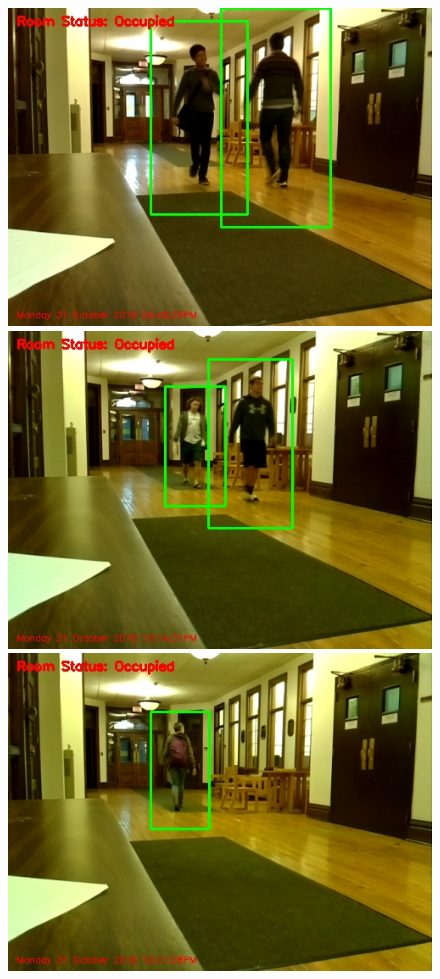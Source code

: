\begin{figure}[h]
  \includegraphics[width=\linewidth]{images/body1.jpg}
\endminipage\hfill
{}
  \includegraphics[width=\linewidth]{images/body2.jpg}
\endminipage\hfill
{}%
  \includegraphics[width=\linewidth]{images/body3.jpg}

\end{figure}
